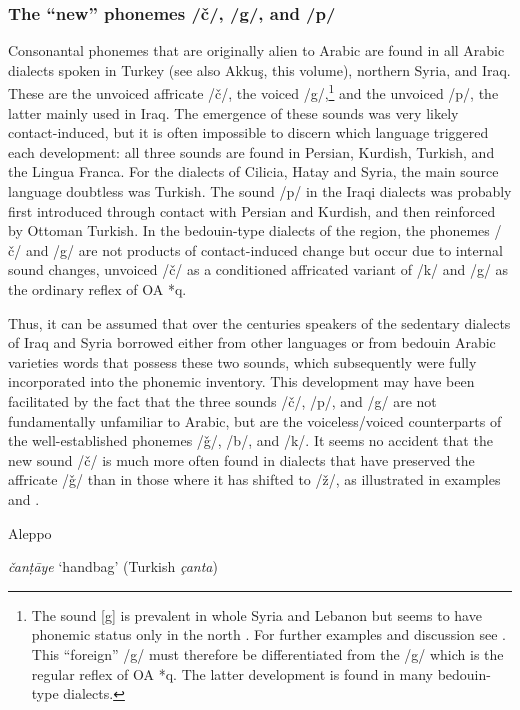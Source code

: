 \documentclass[output=paper]{langsci/langscibook}
\begin{document}
  \subsubsection{The “new” phonemes /č/, /g/, and /p/} 

Consonantal phonemes that are originally alien to Arabic are found in all Arabic dialects spoken in Turkey (see also Akkuş, this volume), northern Syria, and Iraq. These are the unvoiced affricate /č/, the voiced /g/,\footnote{The sound [g] is prevalent in whole Syria and Lebanon but seems to have phonemic status only in the north \citep[26]{Sabuni1980}. For further examples and discussion see \citet{Ferguson1969}. This “foreign” /g/ must therefore be differentiated from the /g/ which is the regular reflex of OA *q. The latter development is found in many bedouin-type dialects.} and the unvoiced /p/, the latter mainly used in Iraq. The emergence of these sounds was very likely contact-induced, but it is often impossible to discern which language triggered each development: all three sounds are found in Persian, Kurdish, Turkish, and the Lingua Franca. For the dialects of Cilicia, Hatay and Syria, the main source language doubtless was Turkish. The sound /p/ in the Iraqi dialects was probably first introduced through contact with Persian and Kurdish, and then reinforced by Ottoman Turkish. In the bedouin-type dialects of the region, the phonemes /č/ and /g/ are not products of contact-induced change but occur due to internal sound changes, unvoiced /č/ as a conditioned affricated variant of /k/ and /g/ as the ordinary reflex of OA *q. 

Thus, it can be assumed that over the centuries speakers of the sedentary dialects of Iraq and Syria borrowed either from other languages or from bedouin Arabic varieties words that possess these two sounds, which subsequently were fully incorporated into the phonemic inventory. This development may have been facilitated by the fact that the three sounds /č/, /p/, and /g/ are not fundamentally unfamiliar to Arabic, but are the voiceless/voiced counterparts of the well-established phonemes /ǧ/, /b/, and /k/. It seems no accident that the new sound /č/ is much more often found in dialects that have preserved the affricate /ǧ/ than in those where it has shifted to /ž/, as illustrated in examples  and .

\ea\label{Aleppo}
Aleppo \citep[205--210]{Sabuni1980}

\textit{čanṭāye} ‘handbag’ (Turkish \textit{çanta})
\end{document}
